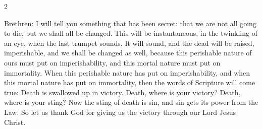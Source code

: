 \begin{multicols}{2}








  Brethren: I will tell you something that has been secret: that we are not all
  going to die, but we shall all be changed. This will be instantaneous, in the
  twinkling of an eye, when the last trumpet sounds. It will sound, and the
  dead will be raised, imperishable, and we shall be changed as well, because
  this perishable nature of ours must put on imperishability, and this mortal
  nature must put on immortality. When this perishable nature has put on
  imperishability, and when this mortal nature has put on immortality, then the
  words of Scripture will come true: Death is swallowed up in victory. Death,
  where is your victory? Death, where is your sting? Now the sting of death is
  sin, and sin gets its power from the Law. So let us thank God for giving us
  the victory through our Lord Jesus Christ.

  \vspace{2mm}


\end{multicols}
